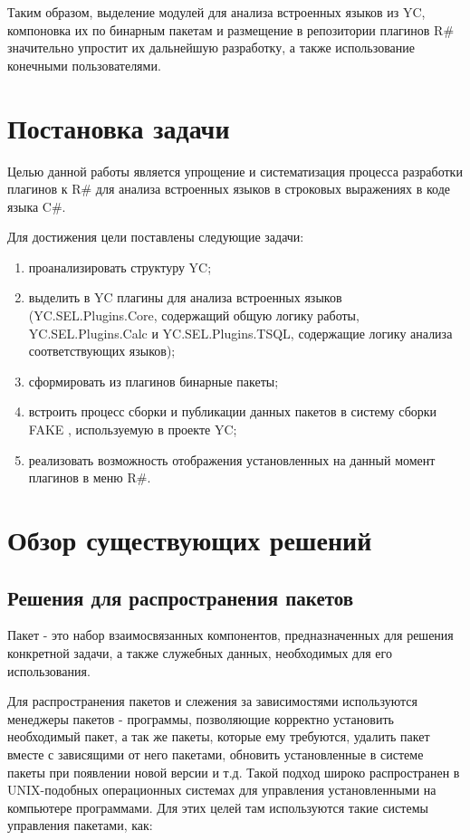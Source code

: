 \documentclass{matmex-diploma-custom}
\begin{document}
Таким образом, выделение модулей для анализа встроенных языков из YC, компоновка их по бинарным пакетам и размещение в репозитории плагинов R\# значительно упростит их дальнейшую разработку, а также использование конечными пользователями.

\section{Постановка задачи}

Целью данной работы является упрощение и систематизация процесса разработки плагинов к R\# для анализа встроенных языков в строковых выражениях в коде языка C\#.

Для достижения цели поставлены следующие задачи:

\begin{enumerate}
\item
проанализировать структуру YC;
\item
выделить в YC плагины для анализа встроенных языков (YC.SEL.Plugins.Core, содержащий общую логику работы, YC.SEL.Plugins.Calc и YC.SEL.Plugins.TSQL, содержащие логику анализа соответствующих языков);
\item
сформировать из плагинов бинарные пакеты;
\item
встроить процесс сборки и публикации данных пакетов в систему сборки FAKE \cite{fake}, используемую в проекте YC;
\item
реализовать возможность отображения установленных на данный момент плагинов в меню R\#.
\end{enumerate}

\section{Обзор существующих решений}

\subsection{Решения для распространения пакетов}

Пакет - это набор взаимосвязанных компонентов, предназначенных для решения конкретной задачи, а также служебных данных, необходимых для его использования.

Для распространения пакетов и слежения за зависимостями используются менеджеры пакетов - программы, позволяющие корректно установить необходимый пакет, а так же пакеты, которые ему требуются, удалить пакет вместе с зависящими от него пакетами, обновить установленные в системе пакеты при появлении новой версии и т.д. Такой подход широко распространен в UNIX-подобных операционных системах для управления установленными на компьютере программами. Для этих целей там используются такие системы управления пакетами, как:
\end{document}
